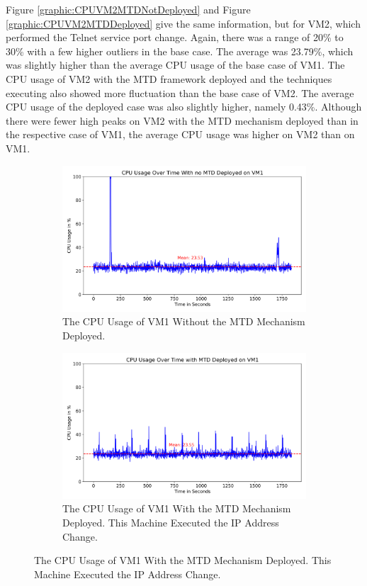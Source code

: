 Figure \ref{graphic:CPUVM2MTDNotDeployed} and Figure \ref{graphic:CPUVM2MTDDeployed} give the same information, but for VM2, which performed the Telnet service port change. Again, there was a range of 20\% to 30\% with a few higher outliers in the base case. The average was 23.79\%, which was slightly higher than the average CPU usage of the base case of VM1. The CPU usage of VM2 with the MTD framework deployed and the techniques executing also showed more fluctuation than the base case of VM2. The average CPU usage of the deployed case was also slightly higher, namely 0.43\%. Although there were fewer high peaks on VM2 with the MTD mechanism deployed than in the respective case of VM1, the average CPU usage was higher on VM2 than on VM1.
\begin{figure}
     \centering
     \begin{subfigure}[b]{0.8\textwidth}
         \centering
         \includegraphics[width=\textwidth]{assets/CPUVM1MTDNotDeployed.png}
         \caption{The CPU Usage of VM1 Without the MTD Mechanism Deployed.}
         \label{graphic:CPUVM1MTDNotDeployed}
     \end{subfigure}
     \hfill
     \begin{subfigure}[b]{0.8\textwidth}
         \centering
         \includegraphics[width=\textwidth]{assets/CPUVM1MTDDeployed.png}
         \caption{The CPU Usage of VM1 With the MTD Mechanism Deployed. This Machine Executed the IP Address Change.}
         \label{graphic:CPUVM1MTDDeployed}
     \end{subfigure}
    \hfill
\end{figure}


